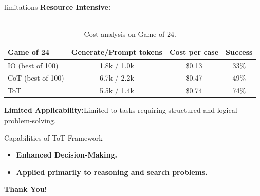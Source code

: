 \documentclass[aspectratio=169, xcolor={dvipsnames}, 10pt, brazil]{beamer}
\begin{document}
\begin{frame}{limitations}
    \textbf{Resource Intensive:}\\
    \\
\begin{table}[h!]
\centering
\begin{tabular}{|l|c|c|c|}
\hline
\textbf{Game of 24} & \textbf{Generate/Prompt tokens} & \textbf{Cost per case} & \textbf{Success} \\ \hline
IO (best of 100)    & 1.8k / 1.0k                   & \$0.13                 & 33\%             \\ \hline
CoT (best of 100)   & 6.7k / 2.2k                   & \$0.47                 & 49\%             \\ \hline
ToT                 & 5.5k / 1.4k                   & \$0.74                 & 74\%             \\ \hline
\end{tabular}
\caption{Cost analysis on Game of 24.}
\end{table}

\textbf{Limited Applicability:}Limited to tasks requiring structured and logical problem-solving.
    
\end{frame}


\begin{frame}{Capabilities of ToT Framework}

\begin{itemize}
    \item \textbf{Enhanced Decision-Making.}
    
    \vspace{.5cm}
    \item \textbf{Applied primarily to reasoning and search problems.}
    
    
\end{itemize}

\end{frame}

\begin{frame}{}
    \centering
    {\Huge \textbf{Thank You!}}
    
\end{frame}
\end{document}
